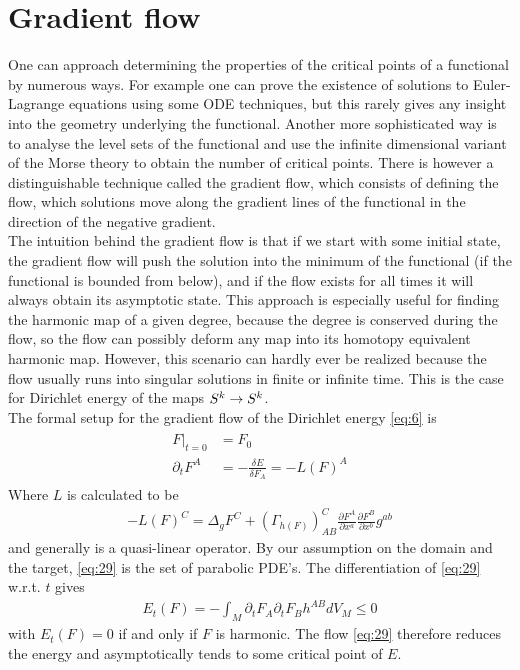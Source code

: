 \section{Gradient flow}
\label{sec:gradient-flow}

One can approach determining the properties of the critical points of
a functional by numerous ways. For example one can prove the existence
of solutions to Euler-Lagrange equations using some ODE techniques,
but this rarely gives any insight into the geometry underlying the
functional. Another more sophisticated way is to analyse the level
sets of the functional and use the infinite dimensional variant of the
Morse theory to obtain the number of critical points. There is however
a distinguishable technique called the gradient flow, which consists
of defining the flow, which solutions move along the gradient lines of
the functional in the direction of the negative gradient.\\


The intuition behind the gradient flow is that if we start with some
initial state, the gradient flow will push the solution into the
minimum of the functional (if the functional is bounded from below),
and if the flow exists for all times it will always obtain its
asymptotic state. This approach is especially useful for finding the
harmonic map of a given degree, because the degree is conserved during
the flow, so the flow can possibly deform any map into its homotopy
equivalent harmonic map. However, this scenario can hardly ever be
realized because the flow usually runs into singular solutions in
finite or infinite time. This is the case for Dirichlet
energy of the maps $S^k\rightarrow S^k$.\\

The formal setup for the gradient flow of the Dirichlet energy
\eqref{eq:6} is
\begin{align}
  \label{eq:29}
    \begin{split}
    F\big|_{t=0}&=F_0\\
    \partial_t F^A&=-\frac{\delta E}{\delta F_A}=-L(F)^A
  \end{split}
\end{align}
Where $L$ is calculated to be
\begin{align}
  \label{eq:30}
  -L(F)^C=\Delta_g F^C+(\Gamma_{h(F)})_{AB}^{C}\frac{\partial
    F^A}{\partial x^a}\frac{\partial F^B}{\partial x^b}g^{ab}
\end{align}
and generally is a quasi-linear operator. By our assumption on the
domain and the target, \eqref{eq:29} is the set of parabolic
PDE's. The differentiation of \eqref{eq:29} w.r.t. $t$ gives
\begin{align}
  \label{eq:31}
  E_t(F)=-\int_M \partial_t F_A\partial_t F_B h^{AB} dV_M\le0
\end{align}
with $E_t(F)=0$ if and only if $F$ is harmonic. The flow \eqref{eq:29}
therefore reduces the energy and asymptotically tends to some
critical point of $E$.\\

